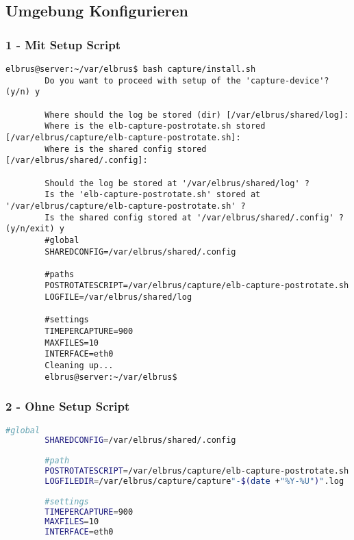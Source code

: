 \documentclass{article}
\begin{document}
	\newpage
	\subsection[file config]{Umgebung Konfigurieren}
	\subsubsection{1 - Mit Setup Script}
	\begin{lstlisting}[caption={Ausführen des 'install.sh' Scripts.}, breaklines=true,]
		elbrus@server:~/var/elbrus$ bash capture/install.sh
		Do you want to proceed with setup of the 'capture-device'? (y/n) y
		
		Where should the log be stored (dir) [/var/elbrus/shared/log]:
		Where is the elb-capture-postrotate.sh stored [/var/elbrus/capture/elb-capture-postrotate.sh]:
		Where is the shared config stored [/var/elbrus/shared/.config]:
		
		Should the log be stored at '/var/elbrus/shared/log' ?
		Is the 'elb-capture-postrotate.sh' stored at '/var/elbrus/capture/elb-capture-postrotate.sh' ?
		Is the shared config stored at '/var/elbrus/shared/.config' ? (y/n/exit) y
		#global
		SHAREDCONFIG=/var/elbrus/shared/.config
		
		#paths
		POSTROTATESCRIPT=/var/elbrus/capture/elb-capture-postrotate.sh
		LOGFILE=/var/elbrus/shared/log
		
		#settings
		TIMEPERCAPTURE=900
		MAXFILES=10
		INTERFACE=eth0
		Cleaning up...
		elbrus@server:~/var/elbrus$
	\end{lstlisting}
	
	\subsubsection{2 - Ohne Setup Script}
	\lstset{style=files}
	\begin{lstlisting}[caption={Anhand von '.env.example' eigene '.env' Datei anlegen.}, language=bash]
		#global
		SHAREDCONFIG=/var/elbrus/shared/.config
		
		#path
		POSTROTATESCRIPT=/var/elbrus/capture/elb-capture-postrotate.sh
		LOGFILEDIR=/var/elbrus/capture/capture"-$(date +"%Y-%U")".log
		
		#settings
		TIMEPERCAPTURE=900
		MAXFILES=10
		INTERFACE=eth0
	\end{lstlisting}

	\newpage
\end{document}
